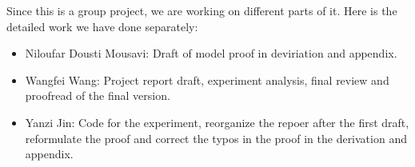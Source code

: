 Since this is a group project, we are working on different parts of it. Here is the detailed work we have done separately:
\begin{itemize}
	\item Niloufar Dousti Mousavi: Draft of model proof in deviriation and appendix.
	\item Wangfei Wang: Project report draft, experiment analysis, final review and proofread of the final version.
	\item Yanzi Jin: Code for the experiment, reorganize the repoer after the first draft, reformulate the proof and correct the typos in the proof in the derivation and appendix.
\end{itemize}